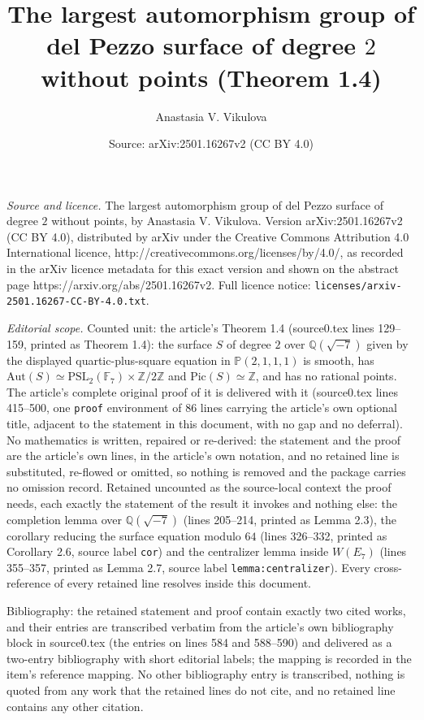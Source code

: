 \documentclass[10pt,a4paper]{amsart}
\title[Theorem 1.4]{The largest automorphism group of del Pezzo surface of degree $2$ without points (Theorem 1.4)}
\author{Anastasia V. Vikulova}
\date{Source: arXiv:2501.16267v2 (CC BY 4.0)}
\begin{document}
\maketitle

\noindent\emph{Source and licence.} The largest automorphism group of del Pezzo surface of degree $2$ without points, by Anastasia V. Vikulova. Version arXiv:2501.16267v2
(CC BY 4.0), distributed by arXiv under the Creative Commons Attribution 4.0 International licence,
http://creativecommons.org/licenses/by/4.0/, as recorded in the arXiv licence metadata for this exact
version and shown on the abstract page https://arxiv.org/abs/2501.16267v2. Full licence notice:
\texttt{licenses/arxiv-2501.16267-CC-BY-4.0.txt}.\par\smallskip

\noindent\textit{Editorial scope.} Counted unit: the article's Theorem 1.4 (source0.tex lines 129--159, printed as Theorem 1.4): the surface $S$ of degree $2$ over $\mathbb{Q}(\sqrt{-7})$ given by the displayed quartic-plus-square equation in $\mathbb{P}(2,1,1,1)$ is smooth, has $\mathrm{Aut}(S)\simeq \mathrm{PSL}_2(\mathbb{F}_7)\times\mathbb{Z}/2\mathbb{Z}$ and $\mathrm{Pic}(S)\simeq\mathbb{Z}$, and has no rational points. The article's complete original proof of it is delivered with it (source0.tex lines 415--500, one \texttt{proof} environment of 86 lines carrying the article's own optional title, adjacent to the statement in this document, with no gap and no deferral). No mathematics is written, repaired or re-derived: the statement and the proof are the article's own lines, in the article's own notation, and no retained line is substituted, re-flowed or omitted, so nothing is removed and the package carries no omission record. Retained uncounted as the source-local context the proof needs, each exactly the statement of the result it invokes and nothing else: the completion lemma over $\mathbb{Q}(\sqrt{-7})$ (lines 205--214, printed as Lemma 2.3), the corollary reducing the surface equation modulo $64$ (lines 326--332, printed as Corollary 2.6, source label \texttt{cor}) and the centralizer lemma inside $W(E_7)$ (lines 355--357, printed as Lemma 2.7, source label \texttt{lemma:centralizer}). Every cross-reference of every retained line resolves inside this document.

Bibliography: the retained statement and proof contain exactly two cited works, and their entries are transcribed verbatim from the article's own bibliography block in source0.tex (the entries on lines 584 and 588--590) and delivered as a two-entry bibliography with short editorial labels; the mapping is recorded in the item's reference mapping. No other bibliography entry is transcribed, nothing is quoted from any work that the retained lines do not cite, and no retained line contains any other citation.
\end{document}

